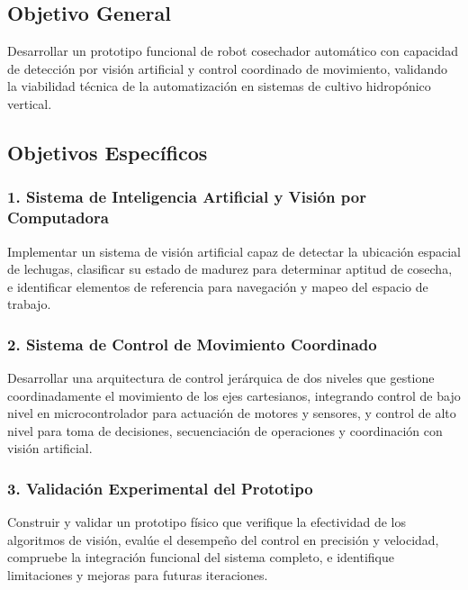 
\subsection*{Objetivo General}

Desarrollar un prototipo funcional de robot cosechador automático con capacidad de detección por visión artificial y control coordinado de movimiento, validando la viabilidad técnica de la automatización en sistemas de cultivo hidropónico vertical.

\subsection*{Objetivos Específicos}

\subsubsection*{1. Sistema de Inteligencia Artificial y Visión por Computadora}

Implementar un sistema de visión artificial capaz de detectar la ubicación espacial de lechugas, clasificar su estado de madurez para determinar aptitud de cosecha, e identificar elementos de referencia para navegación y mapeo del espacio de trabajo.

\subsubsection*{2. Sistema de Control de Movimiento Coordinado}

Desarrollar una arquitectura de control jerárquica de dos niveles que gestione coordinadamente el movimiento de los ejes cartesianos, integrando control de bajo nivel en microcontrolador para actuación de motores y sensores, y control de alto nivel para toma de decisiones, secuenciación de operaciones y coordinación con visión artificial.

\subsubsection*{3. Validación Experimental del Prototipo}

Construir y validar un prototipo físico que verifique la efectividad de los algoritmos de visión, evalúe el desempeño del control en precisión y velocidad, compruebe la integración funcional del sistema completo, e identifique limitaciones y mejoras para futuras iteraciones.